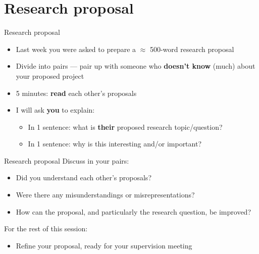 \part{Research proposal}
\frame{\partpage}

\begin{frame}{Research proposal}
    \begin{itemize}
        \pause\item Last week you were asked to prepare a $\approx$ 500-word research proposal
        \pause\item Divide into pairs --- pair up with someone who \textbf{doesn't know} (much) about your proposed project
        \pause\item 5 minutes: \textbf{read} each other's proposals
        \pause\item I will ask \textbf{you} to explain:
            \begin{itemize}
                \pause\item In 1 sentence: what is \textbf{their} proposed research topic/question?
                \pause\item In 1 sentence: why is this interesting and/or important?
            \end{itemize}
    \end{itemize}
\end{frame}

\begin{frame}{Research proposal}
    Discuss in your pairs:
    \begin{itemize}
        \pause\item Did you understand each other's proposals?
        \pause\item Were there any misunderstandings or misrepresentations?
        \pause\item How can the proposal, and particularly the research question, be improved?
    \end{itemize}
    For the rest of this session:
    \begin{itemize}
        \pause\item Refine your proposal, ready for your supervision meeting
    \end{itemize}
\end{frame}

